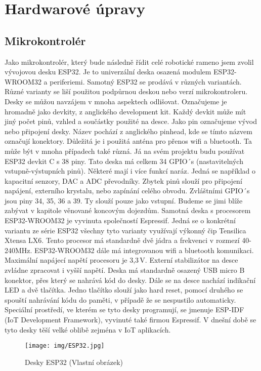 \section{Hardwarové úpravy}

\subsection{Mikrokontrolér}Jako mikrokontrolér, který bude následně řídit celé robotické rameno jsem zvolil vývojovou desku ESP32. Je to univerzální deska osazená modulem ESP32-WROOM32 a periferiemi. Samotný ESP32 
se prodává v různých variantách. Různé varianty se liší použitou podpůrnou deskou nebo verzí 
mikrokontroleru. Desky se můžou navzájem v mnoha aspektech odlišovat. Označujeme je 
hromadně jako devkity, z anglického development kit. Každý devkit může mít jiný počet pinů,
vzhled a součástky použité na desce. Jako pin označujeme vývod nebo připojení desky. 
Název pochází z anglického pinhead, kde se tímto názvem označují konektory. Důležitá je i 
použitá anténa pro přenos wifi a bluetooth. Ta může být v mnoha případech také různá. Já na 
svém projektu budu používat ESP32 devkit C s 38 piny. Tato deska má celkem 34 GPIO´s 
(nastavitelných vstupně-výstupních pinů). Některé mají i více funkcí naráz. Jedná se například 
o kapacitní senzory, DAC a ADC převodníky. Zbytek pinů slouží pro připojení napájení, 
externího krystalu, nebo zapínání celého obvodu. Zvláštními GPIO´s jsou piny 34, 35, 36 a 39. 
Ty slouží pouze jako vstupní. Budeme se jimi blíže zabývat v kapitole věnované koncovým
dojezdům. Samotná deska s procesorem ESP32-WROOM32 je vyvinuta společností Espressif. Jedná 
se o konkrétní variantu ze série ESP32 všechny tyto varianty využívají výkonný čip Tensilica 
Xtensa LX6. Tento procesor má standardně dvě jádra a frekvenci v rozmezí 40-240MHz. 
ESP32-WROOM32 dále má integrovanou wifi a bluetooth komunikaci. Maximální napájecí 
napětí procesoru je 3,3\,V. Externí stabilizátor na desce zvládne zpracovat i vyšší napětí. Deska 
má standardně osazený USB micro B konektor, přes který se nahrává kód do desky. Dále se na desce nachází indikační LED a dvě tlačítka. Jedno tlačítko slouží jako hard reset, pomocí 
druhého se spouští nahrávání kódu do paměti, v případě že se nespustilo automaticky. Speciální 
prostředí, ve kterém se tyto desky programují, se jmenuje ESP-IDF (IoT Development 
Framework), vyvinuté také firmou Espressif. V dnešní době se tyto desky těší velké oblibě 
zejména v IoT aplikacích. \cite{ESP32}

\begin{figure}
		\begin{center}
			\texttt{[image: img/ESP32.jpg]}
			\caption{Desky ESP32 (Vlastní obrázek)}
			\label{fig:ESP32}
		\end{center}
		\vspace{0mm}
\end{figure}

